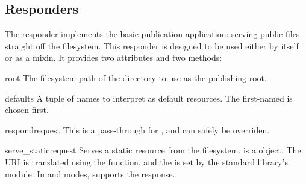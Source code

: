 \subsection{ Responders \label{static}}

The  responder implements the basic publication application:
serving public files straight off the filesystem. This responder is designed to
be used either by itself or as a mixin. It provides two attributes and two
methods:

\begin{memberdesc}[string]{root}
The filesystem path of the directory to use as the publishing root.
\end{memberdesc}

\begin{memberdesc}[tuple]{defaults}
A tuple of names to interpret as default resources. The first-named is chosen
first.
\end{memberdesc}


\begin{methoddesc}{respond}{request}
This is a pass-through for , and can safely be overriden.
\end{methoddesc}

\begin{methoddesc}{serve_static}{request} Serves a static resource from the
filesystem.  is a  object. The URI is translated
using the  function, and the
 is set by the standard library's
 module. In
 and  modes,  supports the
response.
\end{methoddesc}

